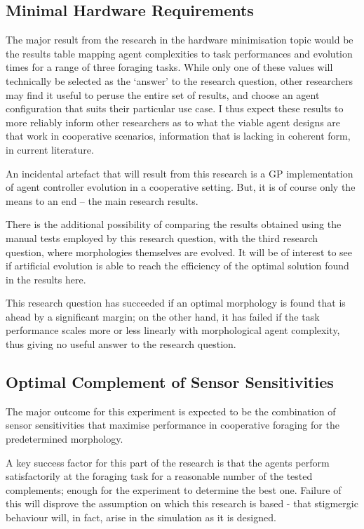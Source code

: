 \documentclass[a4paper,12pt]{article}
\begin{document}
\subsection{Minimal Hardware Requirements}
The major result from the research in the hardware minimisation topic would be the results table mapping agent complexities to task performances and evolution times for a range of three foraging tasks. While only one of these values will technically be selected as the ‘answer’ to the research question, other researchers may find it useful to peruse the entire set of results, and choose an agent configuration that suits their particular use case.
I thus expect these results to more reliably inform other researchers as to what the viable agent designs are that work in cooperative scenarios, information that is lacking in coherent form, in current literature.

An incidental artefact that will result from this research is a GP implementation of agent controller evolution in a cooperative setting. But, it is of course only the means to an end -- the main research results.

There is the additional possibility of comparing the results obtained using the manual tests employed by this research question, with the third research question, where morphologies themselves are evolved. It will be of interest to see if artificial evolution is able to reach the efficiency of the optimal solution found in the results here.

This research question has succeeded if an optimal morphology is found that is ahead by a significant margin; on the other hand, it has failed if the task performance scales more or less linearly with morphological agent complexity, thus giving no useful answer to the research question.

\subsection{Optimal Complement of Sensor Sensitivities}
The major outcome for this experiment is expected to be the combination of sensor sensitivities that maximise performance in cooperative foraging for the predetermined morphology.

A key success factor for this part of the research is that the agents perform satisfactorily at the foraging task for a reasonable number of the tested complements; enough for the experiment to determine the best one. Failure of this will disprove the assumption on which this research is based - that stigmergic behaviour will, in fact, arise in the simulation as it is designed.
\end{document}
